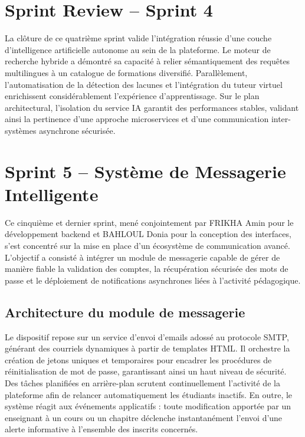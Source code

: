\section{Sprint Review -- Sprint 4}

La clôture de ce quatrième sprint valide l'intégration réussie d'une couche d'intelligence artificielle autonome au sein de la plateforme. Le moteur de recherche hybride a démontré sa capacité à relier sémantiquement des requêtes multilingues à un catalogue de formations diversifié. Parallèlement, l'automatisation de la détection des lacunes et l'intégration du tuteur virtuel enrichissent considérablement l'expérience d'apprentissage. Sur le plan architectural, l'isolation du service IA garantit des performances stables, validant ainsi la pertinence d'une approche microservices et d'une communication inter-systèmes asynchrone sécurisée.

\newpage


\section{Sprint 5 -- Système de Messagerie Intelligente}

Ce cinquième et dernier sprint, mené conjointement par FRIKHA Amin pour le développement backend et BAHLOUL Donia pour la conception des interfaces, s'est concentré sur la mise en place d'un écosystème de communication avancé. L'objectif a consisté à intégrer un module de messagerie capable de gérer de manière fiable la validation des comptes, la récupération sécurisée des mots de passe et le déploiement de notifications asynchrones liées à l'activité pédagogique.

\subsection{Architecture du module de messagerie}

Le dispositif repose sur un service d'envoi d'emails adossé au protocole SMTP, générant des courriels dynamiques à partir de templates HTML. Il orchestre la création de jetons uniques et temporaires pour encadrer les procédures de réinitialisation de mot de passe, garantissant ainsi un haut niveau de sécurité. Des tâches planifiées en arrière-plan scrutent continuellement l'activité de la plateforme afin de relancer automatiquement les étudiants inactifs. En outre, le système réagit aux événements applicatifs : toute modification apportée par un enseignant à un cours ou un chapitre déclenche instantanément l'envoi d'une alerte informative à l'ensemble des inscrits concernés.

